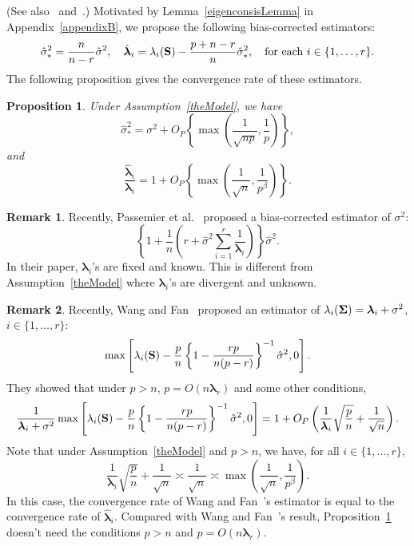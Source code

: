 \documentclass[times,sort&compress,3p]{elsarticle}
\newcommand{\bfsym}[1]{\ensuremath{\boldsymbol{#1}}}
\def\blambda {\bfsym {\lambda}}        \def\bLambda {\bfsym {\Lambda}}
\theoremstyle{plain}
\newtheorem{proposition}{\quad\quad Proposition}
\theoremstyle{definition}
\newtheorem{remark}{\quad\quad Remark}
\theoremstyle{remark}
\begin{document}
(See also~\cite{Fan2015Asymptotics} and~\cite{Passemier2015}.)
Motivated by Lemma~\ref{eigenconsisLemma} in Appendix~\ref{appendixB}, we propose the following bias-corrected estimators:
$$
\hat{\sigma}_*^2= \frac{n}{n-r} \hat{\sigma}^2,
\quad
\hat{\blambda}_i=\lambda_i(\BS)-\frac{p+n-r}{n}\hat{\sigma}_*^2,
\quad
\text{for each $i\in\{1,\ldots, r\}$}.
$$
The following proposition gives the convergence rate of these estimators.
\begin{proposition}\label{varianceEstimation}
    Under Assumption~\ref{theModel}, we have 
    \begin{equation}\label{varianceEstimationPropResult1}
        \hat{\sigma}_*^2=\sigma^2 + O_P\left\{\max \left(\frac{1}{\sqrt{np}},\frac{1}{p}\right)\right\},
    \end{equation}
    and
    \begin{equation}\label{varianceEstimationPropResult2}
        \frac{\hat{\blambda}_i}{\blambda_i}
        =
        1+
        O_P\left\{\max\left(\frac{1}{\sqrt{n}},\frac{1}{p^{\beta}}\right)\right\}.
    \end{equation}
\end{proposition}
\begin{remark}
    Recently, Passemier {\rm et al.}~\cite{Passemier2015} proposed a bias-corrected estimator of $\sigma^2$:
$$
\left\{1+\frac{1}{n}\left(r+\hat{\sigma}^2\sum_{i=1}^r \frac{1}{\blambda_i}\right)\right\}\hat{\sigma}^2.
$$
In their paper, $\blambda_i$'s are fixed and known.
    This is different from Assumption~\ref{theModel} where $\blambda_i$'s are divergent and unknown.
\end{remark}
\begin{remark}
    Recently, Wang and Fan~\cite{Fan2015Asymptotics} proposed an estimator of
    $\lambda_i(\bSigma)=\blambda_i+\sigma^2$, $i\in\{1,\ldots, r\}$:
    $$
    \max\left[\lambda_i(\mathbf{S})-\frac{p}{n}\left\{1-\frac{rp}{n(p-r)}\right\}^{-1}\hat{\sigma}^2,0\right].
    $$
    They showed that under $p>n$, $p=O(n\blambda_r)$ and some other conditions,
    $$
    \frac{1}{\blambda_i+\sigma^2}\max\left[\lambda_i(\BS)-\frac{p}{n}\left\{ 1-\frac{rp}{n(p-r)}\right\}^{-1}\hat{\sigma}^2,0\right]
    =1+O_P\left(\frac{1}{\blambda_i}\sqrt{\frac{p}{n}}+\frac{1}{\sqrt{n}}\right).
    $$
    Note that under Assumption~\ref{theModel} and $p>n$, we have, for all $i\in\{1,\ldots, r\}$,
    $$
\frac{1}{\blambda_i}\sqrt{\frac{p}{n}}+\frac{1}{\sqrt{n}}\asymp
\frac{1}{\sqrt{n}}
\asymp
        \max\left(\frac{1}{\sqrt{n}},\frac{1}{p^{\beta}}\right).
    $$
    In this case, the convergence rate of Wang and Fan~\cite{Fan2015Asymptotics}'s estimator is equal to the convergence rate of $\hat{\blambda}_i$.
    Compared with Wang and Fan~\cite{Fan2015Asymptotics}'s result, Proposition~\ref{varianceEstimation} doesn't need the conditions $p>n$ and $p=O(n\blambda_r)$.
\end{remark}
\end{document}
